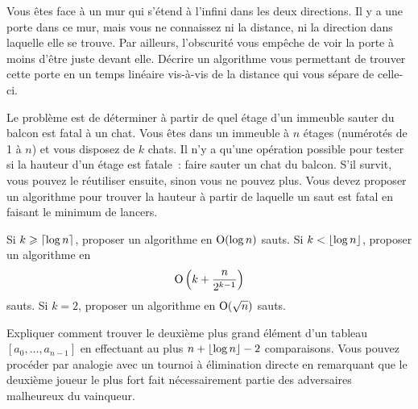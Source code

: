 \documentclass{magnolia}
\begin{document}


Vous êtes face à un mur qui s'étend à l'infini dans les deux directions. Il y a une porte dans ce mur, mais vous ne connaissez ni la distance, ni la direction dans laquelle elle se trouve. Par ailleurs, l'obscurité vous empêche de voir la porte à moins d'être juste devant elle.
Décrire un algorithme vous permettant de trouver cette porte en un temps linéaire vis-à-vis de la distance qui vous sépare de celle-ci.

Le problème est de déterminer à partir de quel étage d'un immeuble sauter du balcon est
fatal à un chat. Vous êtes dans un immeuble à $n$ étages (numérotés de 1 à $n$) et vous disposez de $k$ chats. Il n'y a qu'une opération possible pour tester si la hauteur d'un étage est fatale~: faire sauter un chat du balcon. S'il survit, vous pouvez le réutiliser ensuite, sinon vous ne pouvez plus. Vous devez proposer un algorithme pour trouver la hauteur à partir de laquelle un saut est fatal en faisant le minimum de lancers.
\begin{questions}
\question Si $k\geqslant \left\lceil\log n\right\rceil$, proposer un algorithme en ${\rm O}(\log n)$ sauts.
\question Si $k<\left\lfloor\log n\right\rfloor$, proposer un algorithme en
  \[{\rm O}\left(k+\frac{n}{2^{k-1}}\right)\]
  sauts.
\question Si $k=2$, proposer un algorithme en ${\rm O}(\sqrt{n})$ sauts.
\end{questions}

Expliquer comment trouver le deuxième plus grand élément d'un tableau $[a_0,\ldots,a_{n-1}]$
en effectuant au plus $n+\left\lfloor\log n\right\rfloor-2$ comparaisons. Vous pouvez procéder par analogie avec
un tournoi à élimination directe en remarquant que le deuxième joueur le plus fort fait
nécessairement partie des adversaires malheureux du vainqueur.
\end{document}

